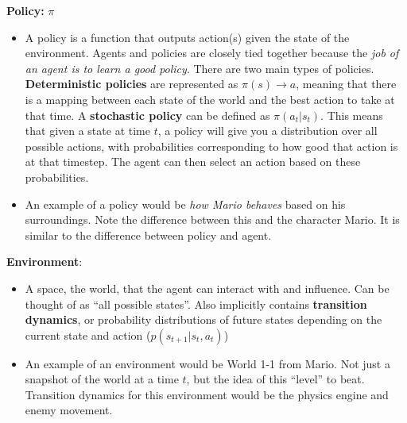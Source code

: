     \textbf{Policy:} $\pi$
    \begin{itemize}
        \item A policy is a function that outputs action(s) given the state of the environment. Agents and policies are closely tied together because the \textit{job of an agent is to learn a good policy}. There are two main types of policies. \textbf{Deterministic policies} are represented as $\pi(s) \rightarrow a$, meaning that there is a mapping between each state of the world and the best action to take at that time. A \textbf{stochastic policy} can be defined as $\pi(a_t|s_t)$. This means that given a state at time $t$, a policy will give you a distribution over all possible actions, with probabilities corresponding to how good that action is at that timestep. The agent can then select an action based on these probabilities.
        \item An example of a policy would be \textit{how Mario behaves} based on his surroundings. Note the difference between this and the character Mario. It is similar to the difference between policy and agent.
    \end{itemize}

    \textbf{Environment}:
    \begin{itemize}
        \item A space, the world, that the agent can interact with and influence. Can be thought of as ``all possible states''. Also implicitly contains \textbf{transition dynamics}, or probability distributions of future states depending on the current state and action ($p(s_{t+1}|s_t,a_t)$)
        \item An example of an environment would be World 1-1 from Mario. Not just a snapshot of the world at a time $t$, but the idea of this ``level'' to beat. Transition dynamics for this environment would be the physics engine and enemy movement.
    \end{itemize}

